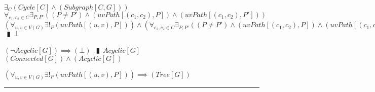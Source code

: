 \documentclass{book}
\newcommand{\pipe}{$\phantom{(}\vrectangleblack\phantom{)}$}
\newcommand{\pr}[1]{\left(#1\right)}
\begin{document}
\begin{enumerate}
\begin{enumerate}
\begin{enumerate}
      \lit $\exists_{C}\pr{Cycle[C] \land (Subgraph[C, G])}$
      \lit $\forall_{c_1, c_2 \in C} \exists_{P, P'}\pr{(P \neq P') \land \pr{uvPath[(c_1, c_2), P]} \land \pr{uvPath[(c_1, c_2), P']}}$
      \lit $\pr{\forall_{u, v \in V(G)} \exists!_{P}\pr{uvPath[(u, v), P]}} \land \pr{\forall_{c_1, c_2 \in C} \exists_{P, P'}\pr{(P \neq P') \land \pr{uvPath[(c_1, c_2), P]} \land \pr{uvPath[(c_1, c_2), P']}}}$ \pipe $\bot$
    \end{enumerate}
    \lit $(\lnot Acyclic[G]) \implies (\bot)$ \pipe $Acyclic[G]$
    \lit $(Connected[G]) \land (Acyclic[G])$
  \end{enumerate}
  \lit $\pr{\forall_{u, v \in V(G)} \exists!_{P}\pr{uvPath[(u, v), P]}} \implies (Tree[G])$
\end{enumerate} \vspace{.75mm} \hrule \vspace{.75mm} \ \\ 
\end{document}

